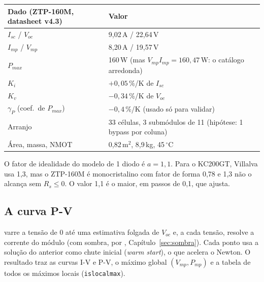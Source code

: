 
\begin{center}\small
\begin{tabular}{@{}ll@{}}
\toprule
Dado (ZTP-160M, datasheet v4.3) & Valor \\ \midrule
$I_{sc}$ / $V_{oc}$ & 9,02\,A / 22,64\,V \\
$I_{mp}$ / $V_{mp}$ & 8,20\,A / 19,57\,V \\
$P_{max}$ & 160\,W (mas $V_{mp}I_{mp}=160{,}47$\,W: o cat\'alogo arredonda) \\
$K_i$ & $+0{,}05$\,\%/K de $I_{sc}$ \\
$K_v$ & $-0{,}34$\,\%/K de $V_{oc}$ \\
$\gamma_P$ (coef.\ de $P_{max}$) & $-0{,}4$\,\%/K (usado s\'o para validar) \\
Arranjo & 33 c\'elulas, 3 subm\'odulos de 11 (hip\'otese: 1 bypass por coluna) \\
\'Area, massa, NMOT & 0,82\,m$^2$, 8,9\,kg, 45\,$^\circ$C \\
\bottomrule
\end{tabular}
\end{center}

O fator de idealidade do modelo de 1 diodo \'e $a=1{,}1$. Para o KC200GT, Villalva usa 1,3, mas o
ZTP-160M \'e monocristalino com fator de forma 0,78 e 1,3 n\~ao o alcan\c{c}a sem $R_s\le0$. O
valor 1,1 \'e o maior, em passos de 0,1, que ajusta.

\subsection{A curva P-V}

 varre a tens\~ao de 0 at\'e uma estimativa folgada de $V_{oc}$ e, a
cada tens\~ao, resolve a corrente do m\'odulo (com sombra, por ,
Cap\'itulo~\ref{sec:sombra}). Cada ponto usa a solu\c{c}\~ao do anterior como chute inicial
(\emph{warm start}), o que acelera o Newton. O resultado traz as curvas I-V e P-V, o m\'aximo
global $(V_{mp},P_{mp})$ e a tabela de todos os m\'aximos locais (\texttt{islocalmax}).

